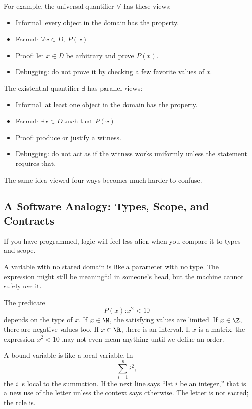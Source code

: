 For example, the universal quantifier $\forall$ has these views:

\begin{itemize}
\item Informal: every object in the domain has the property.
\item Formal: $\forall x\in D,\ P(x)$.
\item Proof: let $x\in D$ be arbitrary and prove $P(x)$.
\item Debugging: do not prove it by checking a few favorite values of $x$.
\end{itemize}

The existential quantifier $\exists$ has parallel views:

\begin{itemize}
\item Informal: at least one object in the domain has the property.
\item Formal: $\exists x\in D$ such that $P(x)$.
\item Proof: produce or justify a witness.
\item Debugging: do not act as if the witness works uniformly unless the statement requires that.
\end{itemize}

The same idea viewed four ways becomes much harder to confuse.

\subsection{A Software Analogy: Types, Scope, and Contracts}

If you have programmed, logic will feel less alien when you compare it to types and scope.

A variable with no stated domain is like a parameter with no type. The expression might still be meaningful in someone's head, but the machine cannot safely use it.

The predicate
\[
P(x): x^2<10
\]
depends on the type of $x$. If $x\in\N$, the satisfying values are limited. If $x\in\Z$, there are negative values too. If $x\in\R$, there is an interval. If $x$ is a matrix, the expression $x^2<10$ may not even mean anything until we define an order.

A bound variable is like a local variable. In
\[
\sum_{i=1}^{n} i^2,
\]
the $i$ is local to the summation. If the next line says ``let $i$ be an integer,'' that is a new use of the letter unless the context says otherwise. The letter is not sacred; the role is.

